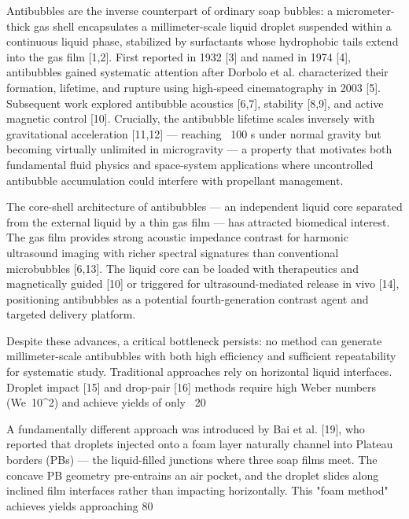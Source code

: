 Antibubbles are the inverse counterpart of ordinary soap bubbles: a micrometer-thick gas shell encapsulates a millimeter-scale liquid droplet suspended within a continuous liquid phase, stabilized by surfactants whose hydrophobic tails extend into the gas film [1,2]. First reported in 1932 [3] and named in 1974 [4], antibubbles gained systematic attention after Dorbolo et al. characterized their formation, lifetime, and rupture using high-speed cinematography in 2003 [5]. Subsequent work explored antibubble acoustics [6,7], stability [8,9], and active magnetic control [10]. Crucially, the antibubble lifetime scales inversely with gravitational acceleration [11,12] — reaching ~100 s under normal gravity but becoming virtually unlimited in microgravity — a property that motivates both fundamental fluid physics and space-system applications where uncontrolled antibubble accumulation could interfere with propellant management.

The core-shell architecture of antibubbles — an independent liquid core separated from the external liquid by a thin gas film — has attracted biomedical interest. The gas film provides strong acoustic impedance contrast for harmonic ultrasound imaging with richer spectral signatures than conventional microbubbles [6,13]. The liquid core can be loaded with therapeutics and magnetically guided [10] or triggered for ultrasound-mediated release in vivo [14], positioning antibubbles as a potential fourth-generation contrast agent and targeted delivery platform.

Despite these advances, a critical bottleneck persists: no method can generate millimeter-scale antibubbles with both high efficiency and sufficient repeatability for systematic study. Traditional approaches rely on horizontal liquid interfaces. Droplet impact [15] and drop-pair [16] methods require high Weber numbers (We~10^2) and achieve yields of only ~20%

A fundamentally different approach was introduced by Bai et al. [19], who reported that droplets injected onto a foam layer naturally channel into Plateau borders (PBs) — the liquid-filled junctions where three soap films meet. The concave PB geometry pre-entrains an air pocket, and the droplet slides along inclined film interfaces rather than impacting horizontally. This "foam method" achieves yields approaching 80%

